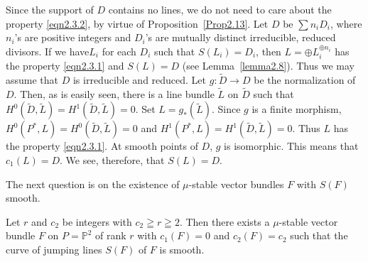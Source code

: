 \begin{Proof}
Since the support of $D$ contains no lines, we do not need to care
about the property \eqref{eqn2.3.2}, by virtue of
Proposition~\ref{Prop2.13}. Let $D$ be $\sum n_i D_i$, where $n_i$'s
are positive integers and $D_i$'s are mutually distinct irreducible,
reduced divisors. If we have\pageoriginale $L_i$ for each $D_i$ such that
$S(L_i)=D_i$, then  $L=\oplus L_i^{\oplus n_i}$ has the property
\eqref{eqn2.3.1} and $S(L)=D$ (see Lemma~\ref{lemma2.8}). Thus we may
assume  that $D$ is irreducible and reduced. Let $g:\widetilde{D}\to
D$ be the normalization of $D$. Then, as is easily seen, there is a
line bundle $\widetilde{L}$ on $\widetilde{D}$ such that
$H^{0}\left(\widetilde{D},
\widetilde{L}\right)=H^{1}\left(\widetilde{D},\widetilde{L}\right)=0$. Set
$L=g_{\ast}\left(\widetilde{L}\right)$. Since $g$ is a finite
morphism,
$H^{0}(P^{\ast},L)=H^{0}\left(\widetilde{D},\widetilde{L}\right)=0$
and
$H^{1}(P^{\ast},L)=H^{1}\left(\widetilde{D},\widetilde{L}\right)=0$. Thus
$L$ has the property \eqref{eqn2.3.1}. At smooth points of $D$, $g$ is
isomorphic. This means that $c_1(L)=D$. We see, therefore, that
$S(L)=D$. 
\enprf
\end{Proof}

The next question is on the existence of $\mu$-stable vector bundles
$F$ with $S(F)$ smooth. 

\begin{Prop}\label{Prop5.3}
Let $r$ and $c_2$ be integers with $c_2\geqq r\geqq 2$.
Then there exists a $\mu$-stable vector bundle $F$ on
$P=\mathbb{P}^{2}$ of rank $r$ with $c_1(F)=0$ and $c_2(F)=c_2$ such
that the curve of jumping lines $S(F)$ of $F$ is smooth.
\end{Prop}

